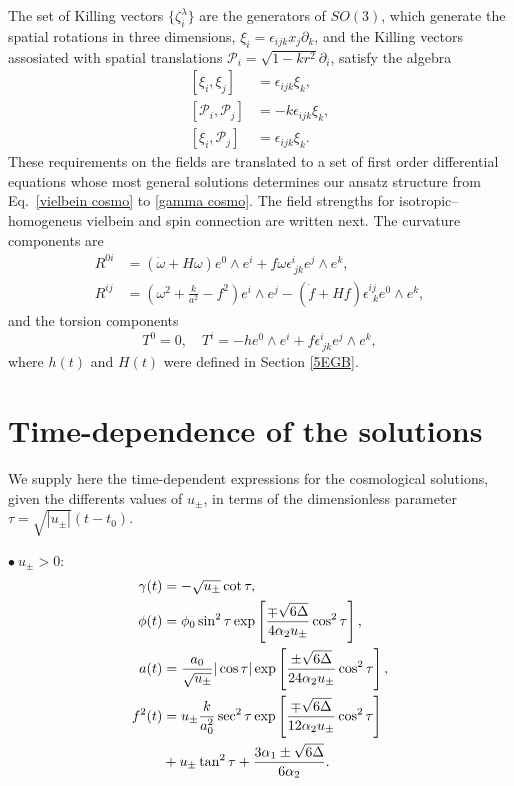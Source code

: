 \documentclass[aps,prd,12pt,superscriptaddress,showpacs,showkeys,longbibliography,reprint,nofootinbib]{revtex4-1}
\begin{document}
The set of Killing vectors $\{\zeta^\lambda_i\}$ are the generators of $SO(3)$, which generate the spatial rotations in three dimensions, $\xi_i=\epsilon_{ijk}x_j\partial_k$, and the Killing vectors assosiated with spatial translations $\mathcal{P}_i=\sqrt{1-kr^2}\partial_i$, satisfy the algebra
\begin{align}
  \left[\xi_i,\xi_j\right]&=\epsilon_{ijk}\xi_k,\\
  \left[\mathcal{P}_i,\mathcal{P}_j\right]&=-k\epsilon_{ijk}\xi_k,\\
  \left[\xi_i,\mathcal{P}_j\right]&=\epsilon_{ijk}\xi_k.
\end{align}
These requirements on the fields are translated to a set of first order differential equations whose most general solutions determines our ansatz structure from Eq.~\eqref{vielbein cosmo} to \eqref{gamma cosmo}. The field strengths for isotropic--homogeneus vielbein and spin connection are written next. The curvature components are
\begin{align}
  R^{0i}&=\left(\dot{\omega}+H\omega\right)e^0\wedge e^i+f\omega\epsilon^i_{\ jk}e^j\wedge e^k,\\
  R^{ij}&=\left(\omega^2+\frac{k}{a^2}-f^2\right)e^i\wedge e^j
  -\left(\dot{f}+Hf\right)\epsilon^{ij}_{\ \ k}e^0\wedge e^k,
\end{align}
and the torsion components
\begin{equation}\label{homotorsion}
  T^0=0,\quad T^i=-he^0\wedge e^i+f\epsilon^i_{\ jk}e^j\wedge e^k,
\end{equation}
where $h(t)$ and $H(t)$ were defined in Section \ref{5EGB}.

\section{Time-dependence of the solutions\label{solutions t}}

We supply here the time-dependent expressions for the cosmological solutions, given the differents values of $u_\pm$, in terms of the dimensionless parameter~$\tau=\sqrt{|u_\pm|}(t-t_0)$.
\medskip

$\bullet\ u_\pm>0$:
\begin{align}
  \gamma(t)&=-\sqrt{u_\pm}\cot\tau,\\
  \phi(t)&=\phi_0\sin^2\tau\exp\left[\frac{\mp\sqrt{6\Delta}}{4\alpha_2 u_\pm}\cos^2\tau\right],\\
  a(t)&=\frac{a_0}{\sqrt{u_\pm}}|\cos\tau|\exp\left[\frac{\pm\sqrt{6\Delta}}{24\alpha_2 u_\pm}\cos^2\tau\right],\\
  f^2(t)&=u_\pm\frac{k}{a_0^2}\sec^2\tau\exp\left[\frac{\mp\sqrt{6\Delta}}{12\alpha_2u_\pm}\cos^2\tau\right]\notag\\
  &+u_\pm\tan^2\tau + \frac{3\alpha_1\pm\sqrt{6\Delta}}{6\alpha_2}.
\end{align}
\end{document}

